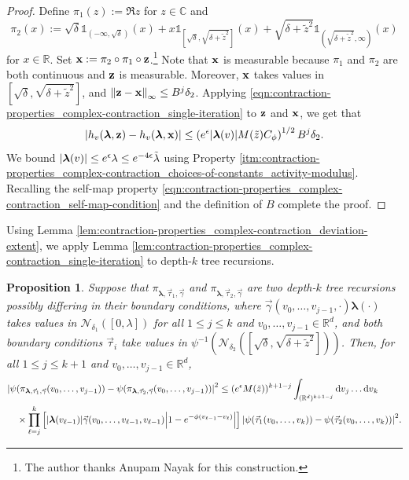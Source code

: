 \documentclass[11pt]{article}
\newcommand{\R}{\mathbb R}
\newcommand{\C}{\mathbb C}
\newcommand{\bl}{\bm{\lambda}}
\newcommand{\bx}{\vb{x}}
\newcommand{\bz}{\vb{z}}
\newcommand{\tl}{\tilde{\lambda}}
\newcommand{\tz}{\tilde{z}}
\newcommand{\indicator}[1]{\mathds{1}_{#1}}
\numberwithin{equation}{section}
\theoremstyle{plain}
\newtheorem{proposition}[theorem]{Proposition}
\theoremstyle{definition}
\theoremstyle{remark}
\begin{document}
\begin{proof}
Define $\pi_{1}(z):=\Re z$ for $z\in\C$ and 
\begin{equation}
\pi_{2}(x):=\sqrt{\delta}\indicator{(-\infty,\sqrt{\delta})}(x)+x\indicator{[\sqrt{\delta},\sqrt{\delta+\tz^{2}}]}(x)+\sqrt{\delta+\tz^{2}}\indicator{(\sqrt{\delta+\tz^{2}},\infty)}(x)
\end{equation}
for $x\in\R$.
Set $\bx:=\pi_{2}\circ\pi_{1}\circ\bz$.\footnote{The author thanks Anupam Nayak for this construction.}
Note that $\bx$ is measurable because $\pi_{1}$ and $\pi_{2}$ are both continuous and $\bz$ is measurable.
Moreover, $\bx$ takes values in $[\sqrt{\delta},\sqrt{\delta+\tz^{2}}]$, and $\norm{\bz-\bx}_{\infty}\le B^{j}\delta_{2}$.
Applying \eqref{eqn:contraction-properties_complex-contraction_single-iteration} to $\bz$ and $\bx$, we get that
\begin{equation}
\abs{h_{v}(\bl,\bz)-h_{v}(\bl,\bx)}
\le \left(e^{\epsilon}\abs{\bl(v)}M(\tilde{z})C_{\phi}\right)^{1/2}B^{j}\delta_{2}.
\end{equation}
We bound $\abs{\bl(v)}\le e^{\epsilon}\lambda\le e^{-4\epsilon}\tl$ using Property \ref{itm:contraction-properties_complex-contraction_choices-of-constants_activity-modulus}.
Recalling the self-map property \eqref{eqn:contraction-properties_complex-contraction_self-map-condition} and the definition of $B$ complete the proof.
\end{proof}

Using Lemma \ref{lem:contraction-properties_complex-contraction_deviation-extent}, we apply Lemma \ref{lem:contraction-properties_complex-contraction_single-iteration} to depth-$k$ tree recursions.

\begin{proposition}
\label{prop:contraction-properties_complex-contraction_multiple-iteration}
Suppose that $\pi_{\bl,\vec{\tau}_{1},\vec{\gamma}}$ and $\pi_{\bl,\vec{\tau}_{2},\vec{\gamma}}$ are two depth-$k$ tree recursions possibly differing in their boundary conditions, where $\vec{\gamma}(v_{0},\dots,v_{j-1},\cdot)\bl(\cdot)$ takes values in $\mathcal{N}_{\delta_{1}}([0,\lambda])$ for all $1\le j\le k$ and $v_{0},\dots,v_{j-1}\in\R^{d}$, and both boundary conditions $\vec{\tau}_{i}$ take values in $\psi^{-1}(\mathcal{N}_{\delta_{2}}([\sqrt{\delta},\sqrt{\delta+\tz^{2}}]))$.
Then, for all $1\le j\le k+1$ and $v_{0},\dots,v_{j-1}\in\R^{d}$,
\begin{equation}
\label{eqn:contraction-properties_complex-contraction_multiple-iteration}
\begin{multlined}
\abs{\psi(\pi_{\bl,\vec{\tau}_{1},\vec{\gamma}}(v_{0},\dots,v_{j-1}))
-\psi(\pi_{\bl,\vec{\tau}_{2},\vec{\gamma}}(v_{0},\dots,v_{j-1}))}^{2}
\le (e^{\epsilon}M(\tilde{z}))^{k+1-j}\int_{(\R^{d})^{k+1-j}}\dd{v}_{j}\dots\dd{v}_{k}
\\
\times \prod_{\ell=j}^{k}\left[\abs{\bl(v_{\ell-1})}\vec{\gamma}(v_{0},\dots,v_{\ell-1},v_{\ell-1})\vphantom{\abs{1-e^{-\phi(v_{\ell-1}-v_{\ell})}}}\abs{1-e^{-\phi(v_{\ell-1}-v_{\ell})}}\right]
\abs{\psi(\vec{\tau}_{1}(v_{0},\dots,v_{k}))-\psi(\vec{\tau}_{2}(v_{0},\dots,v_{k}))}^{2}.
\end{multlined}
\end{equation}
\end{proposition}
\end{document}
